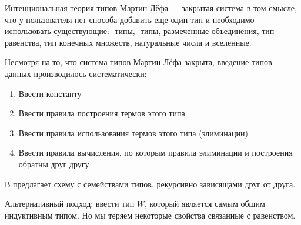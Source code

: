 Интенциональная теория типов Мартин-Лёфа --- закрытая система в том смысле,
что у пользователя нет способа добавить еще один тип и необходимо использовать
существующие: \textPi-типы, \textSigma-типы, размеченные объединения, тип равенства,
тип конечных множеств, натуральные числа и вселенные.

Несмотря на то, что система типов Мартин-Лёфа закрыта, введение типов данных
производилось систематически:
\begin{enumerate}
\item Ввести константу
\item Ввести правила построения термов этого типа
\item Ввести правила использования термов этого типа (элиминации)
\item Ввести правила вычисления, по которым правила элиминации и построения
  обратны друг другу
\end{enumerate}

В \cite{inductive-families} предлагает схему с семействами типов, рекурсивно
зависящами друг от друга.

Альтернативный подход: ввести тип \(W\), который является самым общим индуктивным
типом. Но мы теряем некоторые свойства связанные с равенством.
